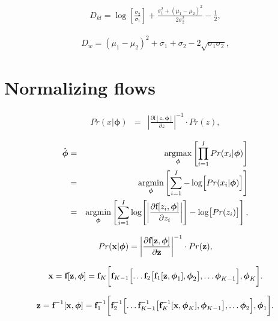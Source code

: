 \documentclass[letterpaper,twoside,openany, titlepage,oldfontcommands,titles,dvipsnames]{memoir}
\begin{document}
\begin{eqnarray}
 D_{kl} = \log\left[\frac{\sigma_2}{\sigma_1}\right]+ \frac{\sigma_1^2 + (\mu_1 - \mu_2)^2}{2 \sigma_2^2} - \frac{1}{2},
 \end{eqnarray}

\begin{eqnarray}
 D_{w} = (\mu_{1}-\mu_{2})^2 + \sigma_{1}+\sigma_{2}-2\sqrt{\sigma_{1}\sigma_{2}},
 \end{eqnarray}

\chapter{Normalizing flows}

\begin{eqnarray}\label{eq:flows_likelihood1d}
  Pr(x|\boldsymbol\phi) &=& \left| \frac{\partial \mbox{f}[z,\boldsymbol\phi]}{\partial z}\right|^{-1} \cdot Pr(z),
 \end{eqnarray}


\begin{eqnarray}
  \hat{\boldsymbol\phi} &=& \mathop{\rm argmax}_{\boldsymbol\phi}\left[\prod_{i=1}^{I} Pr(x_{i}|\boldsymbol\phi)\right]\nonumber \\
  &=& \mathop{\rm argmin}_{\boldsymbol\phi}\left[\sum_{i=1}^{I} -\log\Bigl[Pr(x_{i}|\boldsymbol\phi)\Bigr]\right]\nonumber \\
  &=& \mathop{\rm argmin}_{\boldsymbol\phi}\left[\sum_{i=1}^{I} \log\Biggl[\biggl| \frac{\partial \mbox{f}[z_i,\boldsymbol\phi]}{\partial z_i}\biggr|\Biggr]-\log\bigl[Pr(z_i)\bigr] \right],
 \end{eqnarray}

\begin{eqnarray}
  Pr(\mathbf{x}|\boldsymbol\phi) = \left| \frac{\partial \mbox{\bf f}[\mathbf{z},\boldsymbol\phi]}{\partial \mathbf{z}}\right|^{-1}\cdot Pr(\mathbf{z}),
 \end{eqnarray}



\begin{eqnarray}
  \mathbf{x} = \mbox{\bf f}[\mathbf{z},\boldsymbol\phi] =\mbox{\bf f}_{K}\biggl[\mbox{\bf f}_{K-1}\Bigl[\ldots \mbox{\bf f}_{2}\bigl[\mbox{\bf f}_{1}[\mathbf{z},\boldsymbol\phi_{1}],\boldsymbol\phi_{2}\bigr],\ldots\boldsymbol\phi_{K-1}\Bigr],\boldsymbol\phi_{K}\biggr].
 \end{eqnarray}

\begin{eqnarray}\label{eq:flows_inverse_compositional}
  \mathbf{z} = \mbox{\bf f}^{-1}[\mathbf{x},\boldsymbol\phi] =\mbox{\bf f}^{-1}_{1}\biggl[\mbox{\bf f}^{-1}_{2}\Bigl[\ldots \mbox{\bf f}^{-1}_{K-1}\bigl[\mbox{\bf f}^{-1}_{K}[\mathbf{x},\boldsymbol\phi_{K}],\boldsymbol\phi_{K-1}\bigr],\ldots\boldsymbol\phi_{2}\Bigr],\boldsymbol\phi_{1}\biggr].
 \end{eqnarray}
\end{document}
